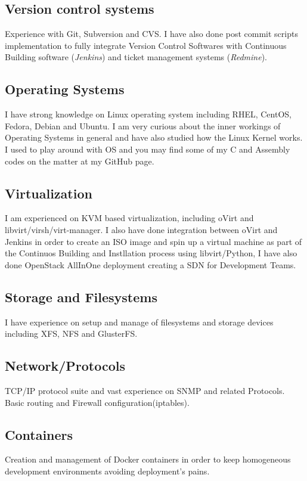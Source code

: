 \documentclass{article}
\begin{document}
\begin{multicols}{2}
\subsection{Version control systems}
Experience with Git, Subversion and CVS. I have also done post commit scripts
implementation to fully integrate Version Control Softwares with Continuous
Building software (\textit{Jenkins}) and ticket management systems 
(\textit{Redmine}). 

\subsection{Operating Systems}
I have strong knowledge on Linux operating system including RHEL, CentOS,
Fedora, Debian and Ubuntu. I am very curious about the inner workings of 
Operating Systems in general and have also studied how the Linux Kernel
works. I used to play around with OS and you may find some of my C and
Assembly codes on the matter at my GitHub page.

\subsection{Virtualization}
I am experienced on KVM based virtualization, including oVirt
and libvirt/virsh/virt-manager. I also have done integration between oVirt
and Jenkins in order to create an ISO image and spin up a virtual machine as part of 
the Continuos Building and Instllation process using libvirt/Python, I have also 
done OpenStack AllInOne deployment creating a SDN for Development Teams.

\subsection{Storage and Filesystems}
I have experience on setup and manage of filesystems and storage devices
including XFS, NFS and GlusterFS.

\subsection{Network/Protocols}
TCP/IP protocol suite and vast experience on SNMP and related Protocols. Basic 
routing and Firewall configuration(iptables).

\subsection{Containers}
Creation and management of Docker containers in order to keep
homogeneous development environments avoiding deployment's pains.


\end{multicols}
\end{document}
